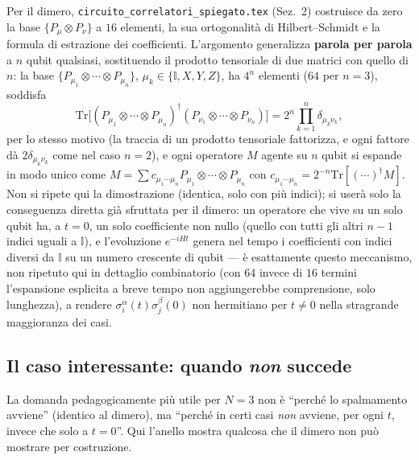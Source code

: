 \documentclass[11pt,a4paper]{article}
\begin{document}
Per il dimero, \texttt{circuito\_correlatori\_spiegato.tex} (Sez.~2) costruisce da zero la base
$\{P_\mu\otimes P_\nu\}$ a $16$ elementi, la sua ortogonalità di Hilbert--Schmidt e la formula di
estrazione dei coefficienti. L'argomento generalizza \textbf{parola per parola} a $n$ qubit
qualsiasi, sostituendo il prodotto tensoriale di due matrici con quello di $n$: la base
$\{P_{\mu_1}\otimes\cdots\otimes P_{\mu_n}\}$, $\mu_k\in\{\mathbb I,X,Y,Z\}$, ha $4^n$ elementi
($64$ per $n=3$), soddisfa
\begin{equation}
\mathrm{Tr}\big[(P_{\mu_1}\!\otimes\!\cdots\!\otimes\! P_{\mu_n})^\dagger
(P_{\nu_1}\!\otimes\!\cdots\!\otimes\! P_{\nu_n})\big]=2^n\prod_{k=1}^n\delta_{\mu_k\nu_k},
\label{eq:ortogN}
\end{equation}
per lo stesso motivo (la traccia di un prodotto tensoriale fattorizza, e ogni fattore dà
$2\delta_{\mu_k\nu_k}$ come nel caso $n=2$), e ogni operatore $M$ agente su $n$ qubit si espande
in modo unico come $M=\sum c_{\mu_1\cdots\mu_n}P_{\mu_1}\otimes\cdots\otimes P_{\mu_n}$ con
$c_{\mu_1\cdots\mu_n}=2^{-n}\mathrm{Tr}[(\cdots)^\dagger M]$. Non si ripete qui la dimostrazione
(identica, solo con più indici); si userà solo la conseguenza diretta già sfruttata per il
dimero: un operatore che vive su un solo qubit ha, a $t=0$, un solo coefficiente non nullo (quello
con tutti gli altri $n-1$ indici uguali a $\mathbb I$), e l'evoluzione $e^{-iHt}$ genera nel
tempo i coefficienti con indici diversi da $\mathbb I$ su un numero crescente di qubit --- è
esattamente questo meccanismo, non ripetuto qui in dettaglio combinatorio (con $64$ invece di
$16$ termini l'espansione esplicita a breve tempo non aggiungerebbe comprensione, solo lunghezza),
a rendere $\sigma_i^\alpha(t)\sigma_j^\beta(0)$ non hermitiano per $t\neq0$ nella stragrande
maggioranza dei casi.

\subsection{Il caso interessante: quando \emph{non} succede}
\label{sec:caso3}

La domanda pedagogicamente più utile per $N=3$ non è ``perché lo spalmamento avviene'' (identico
al dimero), ma ``perché in certi casi \emph{non} avviene, per ogni $t$, invece che solo a
$t=0$''. Qui l'anello mostra qualcosa che il dimero non può mostrare per costruzione.
\end{document}
